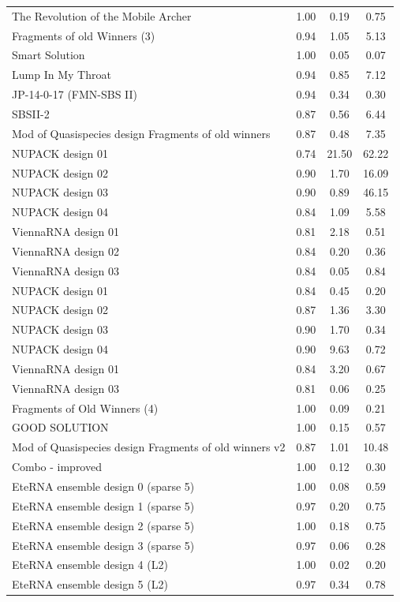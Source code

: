 \documentclass[letter]{bioinfo}
\begin{document}
\begin{center}
\begin{longtable}{l ccc}
The Revolution of the Mobile Archer	&1.00 	&0.19 	&0.75 \\
Fragments of old Winners (3)	&0.94 	&1.05 	&5.13 \\
Smart Solution				&1.00 	&0.05 	&0.07 \\
Lump In My Throat				&0.94 	&0.85 	&7.12 \\
JP-14-0-17 (FMN-SBS II)		&0.94 	&0.34 	&0.30 \\
SBSII-2						&0.87 	&0.56 	&6.44 \\
Mod of Quasispecies design Fragments of old winners	&0.87 	&0.48 	&7.35 \\
NUPACK design 01				&0.74 	&21.50 	&62.22 \\
NUPACK design 02				&0.90 	&1.70 	&16.09 \\
NUPACK design 03				&0.90 	&0.89 	&46.15 \\
NUPACK design 04				&0.84 	&1.09 	&5.58 \\
ViennaRNA design 01			&0.81 	&2.18 	&0.51 \\
ViennaRNA design 02			&0.84 	&0.20 	&0.36 \\
ViennaRNA design 03			&0.84 	&0.05 	&0.84 \\
NUPACK design 01				&0.84 	&0.45 	&0.20 \\
NUPACK design 02				&0.87 	&1.36 	&3.30 \\
NUPACK design 03				&0.90 	&1.70 	&0.34 \\
NUPACK design 04				&0.90 	&9.63 	&0.72 \\
ViennaRNA design 01			&0.84 	&3.20 	&0.67 \\
ViennaRNA design 03			&0.81 	&0.06 	&0.25 \\
Fragments of Old Winners (4)	&1.00 	&0.09 	&0.21 \\
GOOD SOLUTION					&1.00 	&0.15 	&0.57 \\
Mod of Quasispecies design Fragments of old winners v2		&0.87 	&1.01 	&10.48 \\
Combo - improved				&1.00 	&0.12 	&0.30 \\
EteRNA ensemble design 0 (sparse 5) 		&1.00 	&0.08 	&0.59 \\
EteRNA ensemble design 1 (sparse 5)		&0.97 	&0.20 	&0.75 \\
EteRNA ensemble design 2 (sparse 5)		&1.00 	&0.18 	&0.75 \\
EteRNA ensemble design 3 (sparse 5)		&0.97 	&0.06 	&0.28 \\
EteRNA ensemble design 4 (L2)		&1.00 	&0.02 	&0.20 \\
EteRNA ensemble design 5 (L2)		&0.97 	&0.34 	&0.78 \\

\end{longtable}
\end{center}
\end{document}
